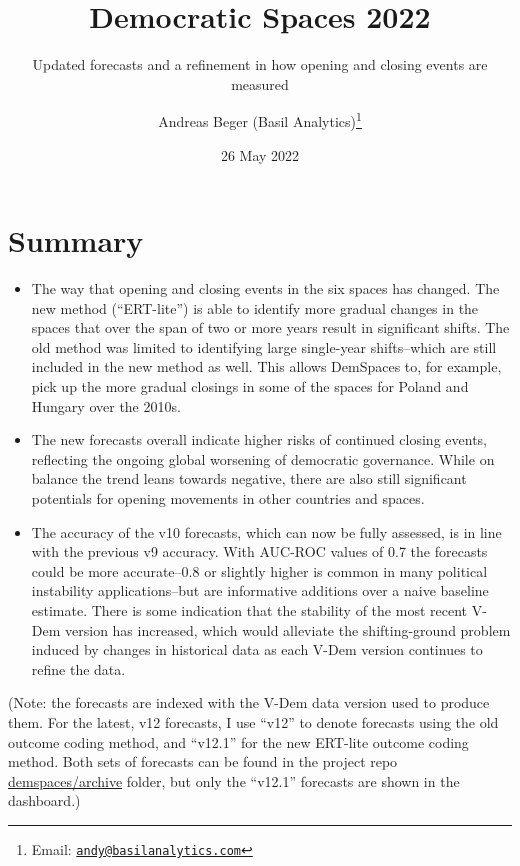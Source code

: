 \documentclass[
  11pt,
]{article}
\title{Democratic Spaces 2022}
\subtitle{Updated forecasts and a refinement in how opening and closing
events are measured}
\author{Andreas Beger (Basil Analytics)\footnote{Email:
  \href{mailto:andy@basilanalytics.com}{\nolinkurl{andy@basilanalytics.com}}}}
\date{26 May 2022}
\providecommand{\tightlist}{%
  \setlength{\itemsep}{0pt}\setlength{\parskip}{0pt}}
\begin{document}
\maketitle

{
\hypersetup{linkcolor=}
\setcounter{tocdepth}{2}
\tableofcontents
}
\hypertarget{summary}{%
\section{Summary}\label{summary}}

\begin{itemize}
\tightlist
\item
  The way that opening and closing events in the six spaces has changed.
  The new method (``ERT-lite'') is able to identify more gradual changes
  in the spaces that over the span of two or more years result in
  significant shifts. The old method was limited to identifying large
  single-year shifts--which are still included in the new method as
  well. This allows DemSpaces to, for example, pick up the more gradual
  closings in some of the spaces for Poland and Hungary over the
  2010s.\\
\item
  The new forecasts overall indicate higher risks of continued closing
  events, reflecting the ongoing global worsening of democratic
  governance. While on balance the trend leans towards negative, there
  are also still significant potentials for opening movements in other
  countries and spaces.
\item
  The accuracy of the v10 forecasts, which can now be fully assessed, is
  in line with the previous v9 accuracy. With AUC-ROC values of 0.7 the
  forecasts could be more accurate--0.8 or slightly higher is common in
  many political instability applications--but are informative additions
  over a naive baseline estimate. There is some indication that the
  stability of the most recent V-Dem version has increased, which would
  alleviate the shifting-ground problem induced by changes in historical
  data as each V-Dem version continues to refine the data.
\end{itemize}

(Note: the forecasts are indexed with the V-Dem data version used to
produce them. For the latest, v12 forecasts, I use ``v12'' to denote
forecasts using the old outcome coding method, and ``v12.1'' for the new
ERT-lite outcome coding method. Both sets of forecasts can be found in
the project repo
\href{https://github.com/vdeminstitute/demspaces/tree/main/archive}{demspaces/archive}
folder, but only the ``v12.1'' forecasts are shown in the dashboard.)
\end{document}
